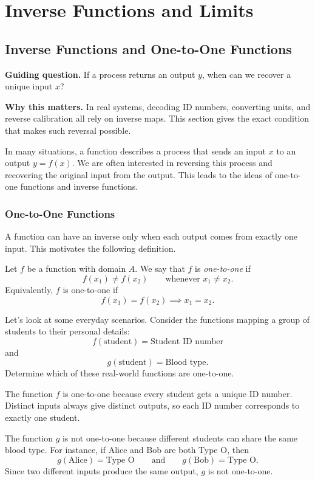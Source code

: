 \chapter{Inverse Functions and Limits}

\section{Inverse Functions and One-to-One Functions}

\begin{remark}
\textbf{Guiding question.} If a process returns an output \(y\), when can we recover a unique input \(x\)?

\textbf{Why this matters.} In real systems, decoding ID numbers, converting units, and reverse calibration all rely on inverse maps. This section gives the exact condition that makes such reversal possible.
\end{remark}

In many situations, a function describes a process that sends an input \(x\) to an output \(y=f(x)\). We are often interested in reversing this process and recovering the original input from the output. This leads to the ideas of one-to-one functions and inverse functions.

\subsection{One-to-One Functions}

A function can have an inverse only when each output comes from exactly one input. This motivates the following definition.

\begin{definition}
Let \(f\) be a function with domain \(A\). We say that \(f\) is \emph{one-to-one} if
\[
f(x_1)\ne f(x_2)
\qquad \text{whenever } x_1\ne x_2.
\]
Equivalently, \(f\) is one-to-one if
\[
f(x_1)=f(x_2) \implies x_1=x_2.
\]
\end{definition}

\begin{example}
Let's look at some everyday scenarios. Consider the functions mapping a group of students to their personal details:
\[
f(\text{student})=\text{Student ID number}
\]
and
\[
g(\text{student})=\text{Blood type}.
\]
Determine which of these real-world functions are one-to-one.
\end{example}

\begin{solution}
The function \(f\) is one-to-one because every student gets a unique ID number. Distinct inputs always give distinct outputs, so each ID number corresponds to exactly one student.

The function \(g\) is not one-to-one because different students can share the same blood type. For instance, if Alice and Bob are both Type O, then
\[
g(\text{Alice})=\text{Type O}
\qquad \text{and} \qquad
g(\text{Bob})=\text{Type O}.
\]
Since two different inputs produce the same output, \(g\) is not one-to-one.
\end{solution}

